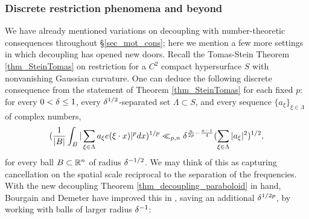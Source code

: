 \documentclass[brochure,english,12pt]{bourbaki}%
\begin{document}
\subsubsection{Discrete restriction phenomena and beyond}
We have already mentioned  variations on decoupling with number-theoretic consequences throughout \S \ref{sec_mot_cons}; here we mention a few more settings in which decoupling has opened new doors. 
Recall the Tomas-Stein Theorem \ref{thm_SteinTomas} on restriction for a $C^2$ compact hypersurface $S$ with nonvanishing Gaussian curvature. 
One can deduce the following discrete consequence from the statement of Theorem \ref{thm_SteinTomas} for each fixed $p$:
for every $0 < \delta \leq 1$, every $\delta^{1/2}$-separated set $\Lambda \subset S$, and every sequence $\{a_\xi \}_{\xi \in \Lambda}$ of complex numbers, 
\[ ( \frac{1}{|B|} \int_B | \sum_{\xi \in \Lambda} a_\xi e(\xi \cdot x)|^p dx)^{1/p} \ll_{p,n} \delta^{\frac{n}{2p} - \frac{n-1}{4}} ( \sum_{\xi \in \Lambda} |a_\xi|^2)^{1/2},\]
for every ball $B \subset \mathbb{R}^n$ of radius $\delta^{-1/2}$. 
We may think of this as capturing cancellation on the spatial scale reciprocal to the separation of the frequencies. With the new decoupling Theorem \ref{thm_decoupling_paraboloid} in hand, Bourgain and Demeter have improved this in \cite[Thm. 2.2]{BouDem15}, saving an additional $\delta^{1/2p}$, by working with balls of larger radius $\delta^{-1}$:
\end{document}
